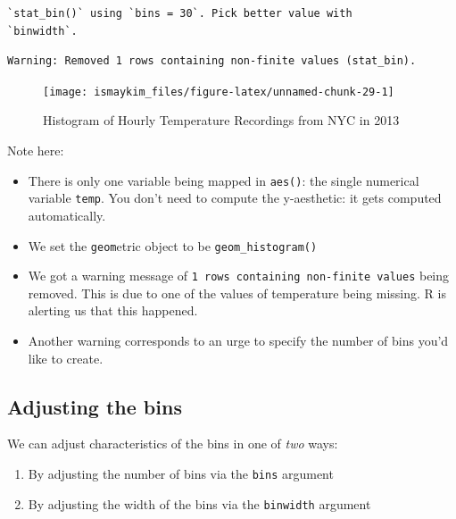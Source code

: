 \documentclass[12pt,]{krantz}
\providecommand{\tightlist}{%
  \setlength{\itemsep}{0pt}\setlength{\parskip}{0pt}}
\theoremstyle{definition}
\theoremstyle{definition}
\theoremstyle{definition}
\theoremstyle{remark}
\begin{document}
\begin{verbatim}
`stat_bin()` using `bins = 30`. Pick better value with
`binwidth`.
\end{verbatim}

\begin{verbatim}
Warning: Removed 1 rows containing non-finite values (stat_bin).
\end{verbatim}

\begin{figure}

{\centering \texttt{[image: ismaykim\_files/figure-latex/unnamed-chunk-29-1]} 

}

\caption{Histogram of Hourly Temperature Recordings from NYC in 2013}\label{fig:unnamed-chunk-29}
\end{figure}

Note here:

\begin{itemize}
\tightlist
\item
  There is only one variable being mapped in \texttt{aes()}: the single
  numerical variable \texttt{temp}. You don't need to compute the
  y-aesthetic: it gets computed automatically.
\item
  We set the \texttt{geom}etric object to be \texttt{geom\_histogram()}
\item
  We got a warning message of
  \texttt{1\ rows\ containing\ non-finite\ values} being removed. This
  is due to one of the values of temperature being missing. R is
  alerting us that this happened.\\
\item
  Another warning corresponds to an urge to specify the number of bins
  you'd like to create.
\end{itemize}

\subsection{Adjusting the bins}\label{adjustbins}

We can adjust characteristics of the bins in one of \emph{two} ways:

\begin{enumerate}
\def\labelenumi{\arabic{enumi}.}
\tightlist
\item
  By adjusting the number of bins via the \texttt{bins} argument
\item
  By adjusting the width of the bins via the \texttt{binwidth} argument
\end{enumerate}
\end{document}

